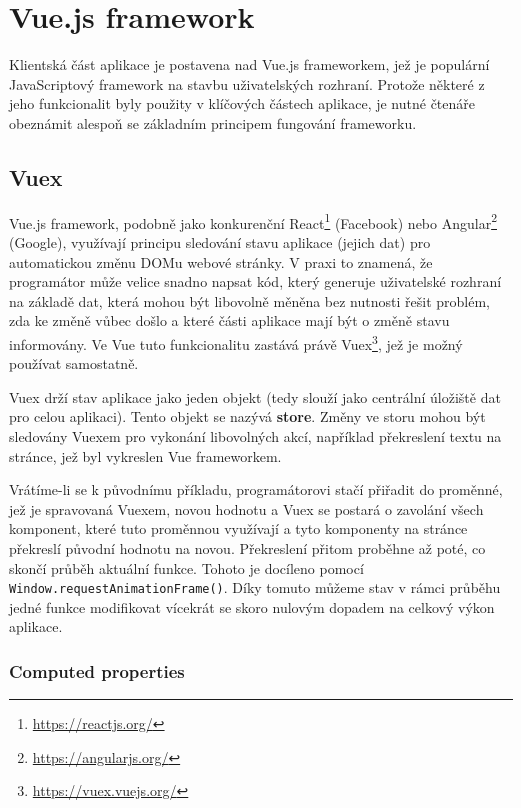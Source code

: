 \chapter{Vue.js framework}
Klientská část aplikace je postavena nad Vue.js frameworkem, jež je populární JavaScriptový framework na stavbu uživatelských rozhraní. Protože některé z jeho funkcionalit byly použity v klíčových částech aplikace, je nutné čtenáře obeznámit alespoň se základním principem fungování frameworku.

\section{Vuex}
Vue.js framework, podobně jako konkurenční React\footnote{\url{https://reactjs.org/}} (Facebook) nebo Angular\footnote{\url{https://angularjs.org/}} (Google), využívají principu sledování stavu aplikace (jejich dat) pro automatickou změnu DOMu webové stránky. V praxi to znamená, že programátor může velice snadno napsat kód, který generuje uživatelské rozhraní na základě dat, která mohou být libovolně měněna bez nutnosti řešit problém, zda ke změně vůbec došlo a které části aplikace mají být o změně stavu informovány. Ve Vue tuto funkcionalitu zastává právě Vuex\footnote{\url{https://vuex.vuejs.org/}}, jež je možný používat samostatně.

Vuex drží stav aplikace jako jeden objekt (tedy slouží jako centrální úložiště dat pro celou aplikaci). Tento objekt se nazývá \textbf{store}. Změny ve storu mohou být sledovány Vuexem pro vykonání libovolných akcí, například překreslení textu na stránce, jež byl vykreslen Vue frameworkem.

\newcommand{\inlinecode}{\texttt}

Vrátíme-li se k původnímu příkladu, programátorovi stačí přiřadit do proměnné, jež je spravovaná Vuexem, novou hodnotu a Vuex se postará o zavolání všech komponent, které tuto proměnnou využívají a tyto komponenty na stránce překreslí původní hodnotu na novou. Překreslení přitom proběhne až poté, co skončí průběh aktuální funkce. Tohoto je docíleno pomocí \\ \texttt{Window.requestAnimationFrame()}. Díky tomuto můžeme stav v rámci průběhu jedné funkce modifikovat vícekrát se skoro nulovým dopadem na celkový výkon aplikace.

\subsection{Computed properties}

